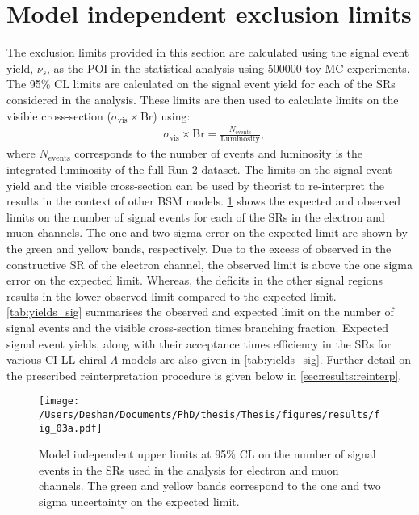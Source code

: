 \section{Model independent exclusion limits}
The exclusion limits provided in this section are calculated using the signal event yield, $\nu_s$, as the POI in the statistical analysis using 500000 toy MC experiments. The 95\% CL limits are calculated on the signal event yield for each of the SRs considered in the analysis. These limits are then used to calculate limits on the visible cross-section ($\sigma_\textrm{vis}\times\textrm{Br}$) using:
\begin{equation}
    \label{eq:visxs}
    \begin{aligned}
        & \sigma_\textrm{vis}\times\textrm{Br} = \frac{N_{\mathrm{events}}}{\mathrm{Luminosity}},
    \end{aligned}
\end{equation}
where $N_{\mathrm{events}}$ corresponds to the number of events and luminosity is the integrated luminosity of the full Run-2 dataset. The limits on the signal event yield and the visible cross-section can be used by theorist to re-interpret the results in the context of other BSM models. \cref{fig:limit_n} shows the expected and observed limits on the number of signal events  for each of the SRs in the electron and muon channels. The one and two sigma error on the expected limit are shown by the green and yellow bands, respectively. Due to the excess of observed in the constructive SR of the electron channel, the observed limit is above the one sigma error on the expected limit. Whereas, the deficits in the other signal regions results in the lower observed limit compared to the expected limit. \cref{tab:yields_sig} summarises the observed and expected limit on the number of signal events and the visible cross-section times branching fraction. Expected signal event yields, along with their acceptance times efficiency in the SRs for various CI LL chiral $\Lambda$ models are also given in \cref{tab:yields_sig}. Further detail on the prescribed reinterpretation procedure is given below in \cref{sec:results:reinterp}.

\begin{figure}[!htpb]

    \centering
    \texttt{[image: /Users/Deshan/Documents/PhD/thesis/Thesis/figures/results/fig\_03a.pdf]}
    \label{fig:limit_n1}
    \caption[Model independent upper limits at 95\% CL on the number of signal events in the SRs used in the analysis for electron and muon channels.]{Model independent upper limits at 95\% CL on the number of signal events in the SRs used in the analysis for electron and muon channels. The green and yellow bands correspond to the one and two sigma uncertainty on the expected limit.}
    \label{fig:limit_n}
\end{figure}


